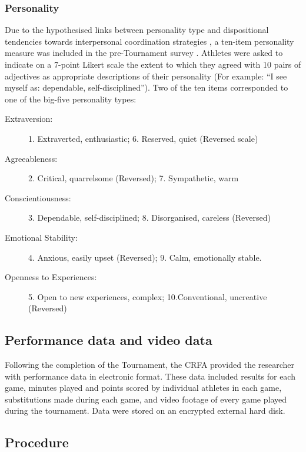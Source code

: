 \documentclass[12pt]{report}
\begin{document}
\subsubsection{Personality}
Due to the hypothesised links between personality type and dispositional tendencies towards interpersonal coordination strategies \citep{Marsh2009a}, a ten-item personality measure was included in the pre-Tournament survey \citep{Gosling2003}. Athletes were asked to indicate on a 7-point Likert scale the extent to which they agreed with 10 pairs of adjectives as appropriate descriptions of their personality (For example: ``I see myself as: dependable, self-disciplined''). Two of the ten items corresponded to one of the big-five personality types:

\begin{description}
\item [Extraversion:] 1. Extraverted, enthusiastic; 6. Reserved, quiet (Reversed scale)
\item [Agreeableness:] 2. Critical, quarrelsome (Reversed); 7. Sympathetic, warm
\item [Conscientiousness:] 3. Dependable, self-disciplined; 8. Disorganised, careless (Reversed)
\item [Emotional Stability:] 4. Anxious, easily upset (Reversed); 9. Calm, emotionally stable.
\item [Openness to Experiences:] 5. Open to new experiences, complex; 10.Conventional, uncreative (Reversed)
\end{description}


\subsection{Performance data and video data}
Following the completion of the Tournament, the CRFA provided the researcher with performance data in electronic format. These data included results for each game, minutes played and points scored by individual athletes in each game, substitutions made during each game, and video footage of every game played during the tournament. Data were stored on an encrypted external hard disk.
















\clearpage
\subsection{Procedure}
\end{document}
